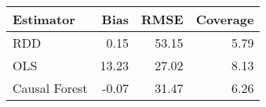 \begin{table}[ht]
\centering
\begin{tabular}{lrrr}
  \hline
Estimator & Bias & RMSE & Coverage \\ 
  \hline
RDD & 0.15 & 53.15 & 5.79 \\ 
  OLS & 13.23 & 27.02 & 8.13 \\ 
  Causal Forest & -0.07 & 31.47 & 6.26 \\ 
   \hline
\end{tabular}
\caption{} 
\end{table}
